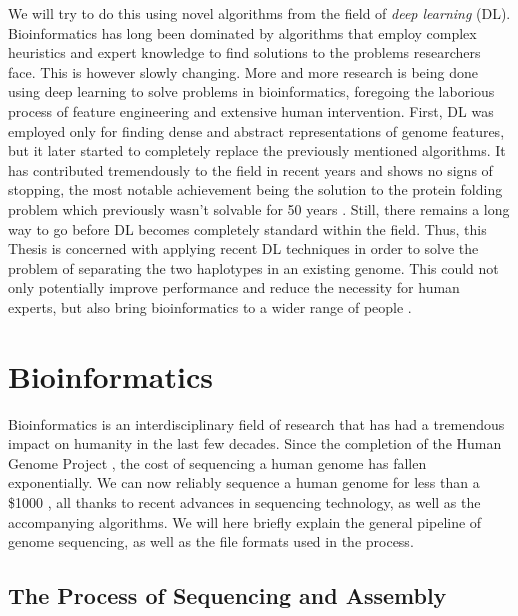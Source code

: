 \documentclass[times, utf8, diplomski, english]{fer_eng}
\begin{document}
We will try to do this using novel algorithms from the field of \textit{deep learning} (DL). Bioinformatics has long been dominated by algorithms that employ complex heuristics and expert knowledge to find solutions to the problems researchers face. This is however slowly changing. More and more research is being done using deep learning to solve problems in bioinformatics, foregoing the laborious process of feature engineering and extensive human intervention. First, DL was employed only for finding dense and abstract representations of genome features, but it later started to completely replace the previously mentioned algorithms. It has contributed tremendously to the field in recent years and shows no signs of stopping, the most notable achievement being the solution to the protein folding problem which previously wasn't solvable for 50 years \cite{alphafold}. Still, there remains a long way to go before DL becomes completely standard within the field. Thus, this Thesis is concerned with applying recent DL techniques in order to solve the problem of separating the two haplotypes in an existing genome. This could not only potentially improve performance and reduce the necessity for human experts, but also bring bioinformatics to a wider range of people \cite{dl_bioinformatics}.

\section{Bioinformatics}

Bioinformatics is an interdisciplinary field of research that has had a tremendous impact on humanity in the last few decades. Since the completion of the Human Genome Project \cite{HGP1} \cite{HGP2}, the cost of sequencing a human genome has fallen exponentially. We can now reliably sequence a human genome for less than a \$1000 \cite{genome_cost}, all thanks to recent advances in sequencing technology, as well as the accompanying algorithms. We will here briefly explain the general pipeline of genome sequencing, as well as the file formats used in the process.

\subsection{The Process of Sequencing and Assembly}
\label{The Process of Sequencing and Assembly}
\end{document}
